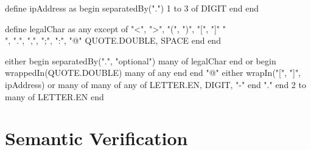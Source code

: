 \begin{rexregexBox}[float=htbp,title={RexRegex code for validating email addresses},breakable,label=code:emailPattern,width=12cm,center,listing options={style=rexregex,basicstyle=\small\ttfamily}]
define ipAddress as
    begin separatedBy(".")
        1 to 3 of DIGIT
    end
end

define legalChar as
    any except of
        "<", ">", "(", ")", "[", "]"
        "\\", ".", ",", ";", ":", "@"
        QUOTE.DOUBLE, SPACE
    end
end

either
    begin separatedBy(".", "optional")
        many of legalChar
    end
or
    begin wrappedIn(QUOTE.DOUBLE)
        many of any
    end
end
"@"
either
    wrapIn("[", "]", ipAddress)
or
    many of
        many of
            any of LETTER.EN, DIGIT, "-"
        end
        "."
    end
    2 to many of LETTER.EN
end
\end{rexregexBox}

{
\hypersetup{citecolor=white}
\begin{listingBox}[float=htb,title={Regex for validating email addresses \cite{EmailRegex}},label=code:emailRegex]
    
\end{listingBox}
}

\section{Semantic Verification} \label{sec:verification}

